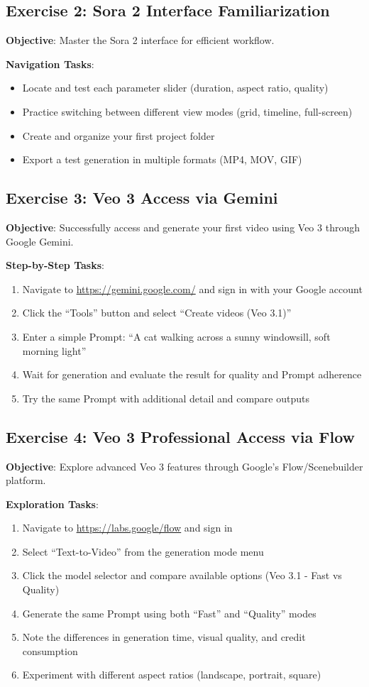 \subsection*{Exercise 2: Sora 2 Interface Familiarization}
\textbf{Objective}: Master the Sora 2 interface for efficient workflow.

\textbf{Navigation Tasks}:
\begin{itemize}
\item Locate and test each parameter slider (duration, aspect ratio, quality)
\item Practice switching between different view modes (grid, timeline, full-screen)
\item Create and organize your first project folder
\item Export a test generation in multiple formats (MP4, MOV, GIF)
\end{itemize}

\subsection*{Exercise 3: Veo 3 Access via Gemini}
\textbf{Objective}: Successfully access and generate your first video using Veo 3 through Google Gemini.

\textbf{Step-by-Step Tasks}:
\begin{enumerate}
\item Navigate to \url{https://gemini.google.com/} and sign in with your Google account
\item Click the ``Tools'' button and select ``Create videos (Veo 3.1)''
\item Enter a simple Prompt: ``A cat walking across a sunny windowsill, soft morning light''
\item Wait for generation and evaluate the result for quality and Prompt adherence
\item Try the same Prompt with additional detail and compare outputs
\end{enumerate}

\subsection*{Exercise 4: Veo 3 Professional Access via Flow}
\textbf{Objective}: Explore advanced Veo 3 features through Google's Flow/Scenebuilder platform.

\textbf{Exploration Tasks}:
\begin{enumerate}
\item Navigate to \url{https://labs.google/flow} and sign in
\item Select ``Text-to-Video'' from the generation mode menu
\item Click the model selector and compare available options (Veo 3.1 - Fast vs Quality)
\item Generate the same Prompt using both ``Fast'' and ``Quality'' modes
\item Note the differences in generation time, visual quality, and credit consumption
\item Experiment with different aspect ratios (landscape, portrait, square)
\end{enumerate}

